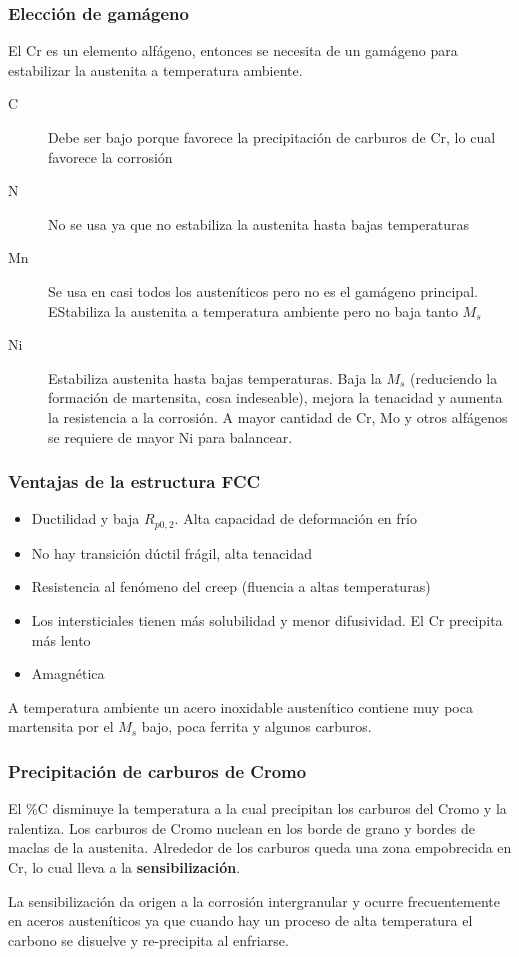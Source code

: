 \subsubsection*{Elección de gamágeno}
El Cr es un elemento alfágeno, entonces se necesita de un gamágeno para estabilizar la austenita a temperatura ambiente.
\begin{description}
	\item[C] Debe ser bajo porque favorece la precipitación de carburos de Cr, lo cual favorece la corrosión
	\item[N] No se usa ya que no estabiliza la austenita hasta bajas temperaturas
	\item[Mn] Se usa en casi todos los austeníticos pero no es el gamágeno principal. EStabiliza la austenita a temperatura ambiente pero no baja tanto $M_s$
	\item[Ni] Estabiliza austenita hasta bajas temperaturas. Baja la $M_s$ (reduciendo la formación de martensita, cosa indeseable), mejora la tenacidad y aumenta la resistencia a la corrosión. A mayor cantidad de Cr, Mo y otros alfágenos se requiere de mayor Ni para balancear.
\end{description}

\subsubsection*{Ventajas de la estructura FCC}
\begin{itemize}
	\item Ductilidad y baja $R_{p0,2}$. Alta capacidad de deformación en frío
	\item No hay transición dúctil frágil, alta tenacidad
	\item Resistencia al fenómeno del creep (fluencia a altas temperaturas)
	\item Los intersticiales tienen más solubilidad y menor difusividad. El Cr precipita más lento
	\item Amagnética
\end{itemize}

A temperatura ambiente un acero inoxidable austenítico contiene muy poca martensita por el $M_s$ bajo, poca ferrita y algunos carburos.

\subsubsection{Precipitación de carburos de Cromo}
El \%C disminuye la temperatura a la cual precipitan los carburos del Cromo y la ralentiza. Los carburos de Cromo nuclean en los borde de grano y bordes de maclas de la austenita. Alrededor de los carburos queda una zona empobrecida en Cr, lo cual lleva a la \textbf{sensibilización}.

La sensibilización da origen a la corrosión intergranular y ocurre frecuentemente en aceros austeníticos ya que cuando hay un proceso de alta temperatura el carbono se disuelve y re-precipita al enfriarse.
